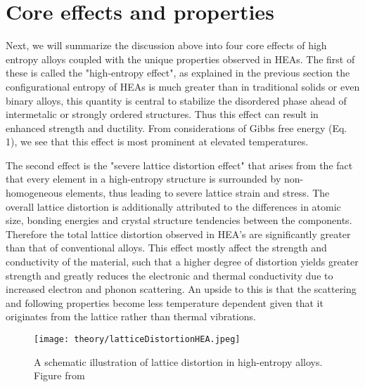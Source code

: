 \section{Core effects and properties}
Next, we will summarize the discussion above into four core effects of high entropy alloys coupled with the unique properties observed in HEAs. The first of these is called the "high-entropy effect", as explained in the previous section the configurational entropy of HEAs is much greater than in traditional solids or even binary alloys, this quantity is central to stabilize the disordered phase ahead of intermetalic or strongly ordered structures. Thus this effect can result in enhanced strength and ductility. From considerations of Gibbs free energy (Eq. 1), we see that this effect is most prominent at elevated temperatures.

The second effect is the "severe lattice distortion effect" that arises from the fact that every element in a high-entropy structure is surrounded by non-homogeneous elements, thus leading to severe lattice strain and stress. The overall lattice distortion is additionally attributed to the differences in atomic size, bonding energies and crystal structure tendencies between the components. Therefore the total lattice distortion observed in HEA's are significantly greater than that of conventional alloys. This effect mostly affect the strength and conductivity of the material, such that a higher degree of distortion yields greater strength and greatly reduces the electronic and thermal conductivity due to increased electron and phonon scattering. An upside to this is that the scattering and following properties become less temperature dependent given that it originates from the lattice rather than thermal vibrations.

\begin{figure} 
\centering
\texttt{[image: theory/latticeDistortionHEA.jpeg]}
\caption{A schematic illustration of lattice distortion in high-entropy alloys. Figure from \cite{owen_jones_2018}}
\end{figure}
 
